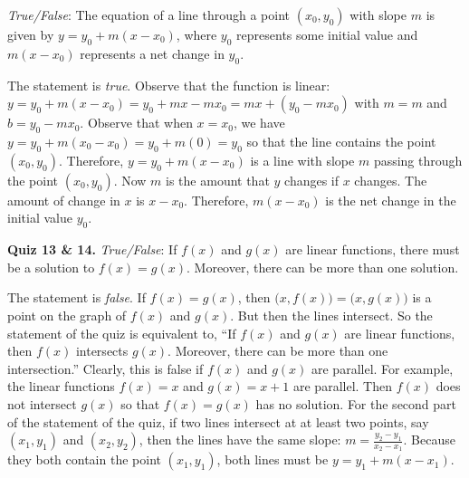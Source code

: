 \documentclass[11pt,letterpaper]{article}
\begin{document}
\quizsol \textit{True/False}: The equation of a line through a point $(x_0, y_0)$ with slope $m$ is given by $y= y_0 + m(x - x_0)$, where $y_0$ represents some initial value and $m(x - x_0)$ represents a net change in $y_0$. \pspace

\sol The statement is \textit{true}. Observe that the function is linear: $y= y_0 + m(x - x_0)= y_0 + mx - mx_0= mx + (y_0 - mx_0)$ with $m= m$ and $b= y_0 - mx_0$. Observe that when $x= x_0$, we have $y= y_0 + m(x_0 - x_0)= y_0 + m(0)= y_0$ so that the line contains the point $(x_0 , y_0)$. Therefore, $y= y_0 + m(x - x_0)$ is a line with slope $m$ passing through the point $(x_0, y_0)$. Now $m$ is the amount that $y$ changes if $x$ changes. The amount of change in $x$ is $x - x_0$. Therefore, $m(x - x_0)$ is the net change in the initial value $y_0$. \pvspace{1.5cm}



\noindent\textbf{Quiz 13 \& 14.} \textit{True/False}: If $f(x)$ and $g(x)$ are linear functions, there must be a solution to $f(x)= g(x)$. Moreover, there can be more than one solution. \phantom{\quizsol\quizsol} \pspace

\sol The statement is \textit{false}. If $f(x)= g(x)$, then $\big(x, f(x) \big)= \big(x, g(x) \big)$ is a point on the graph of $f(x)$ and $g(x)$. But then the lines intersect. So the statement of the quiz is equivalent to, ``If $f(x)$ and $g(x)$ are linear functions, then $f(x)$ intersects $g(x)$. Moreover, there can be more than one intersection.'' Clearly, this is false if $f(x)$ and $g(x)$ are parallel. For example, the linear functions $f(x)= x$ and $g(x)= x + 1$ are parallel. Then $f(x)$ does not intersect $g(x)$ so that $f(x)= g(x)$ has no solution. For the second part of the statement of the quiz, if two lines intersect at at least two points, say $(x_1, y_1)$ and $(x_2, y_2)$, then the lines have the same slope: $m= \frac{y_2 - y_1}{x_2 - x_1}$. Because they both contain the point $(x_1, y_1)$, both lines must be $y= y_1 + m(x - x_1)$. 



\end{document}
